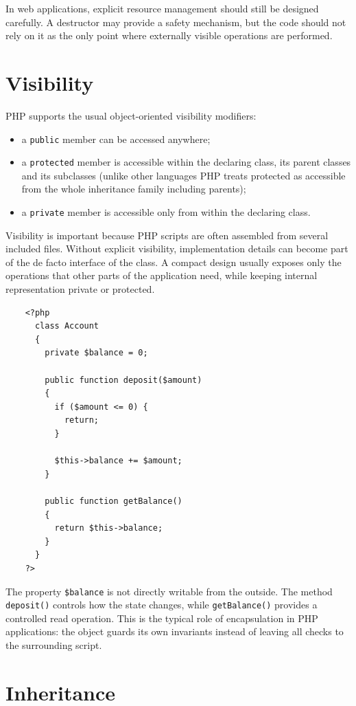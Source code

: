 \documentclass{scrbook}
\begin{document}
	In web applications, explicit resource management should still be designed carefully. A destructor may provide a safety mechanism, but the code should not rely on it as the only point where externally visible operations are performed.
	
	\newpage
	\section{Visibility}
	
	PHP supports the usual object-oriented visibility modifiers:
	\begin{itemize}
		\item a \texttt{public} member can be accessed anywhere;
		\item a \texttt{protected} member is accessible within the declaring class, its parent classes and its subclasses (unlike other languages PHP treats protected as accessible from the whole inheritance family including parents);
		\item a \texttt{private} member is accessible only from within the declaring class.
	\end{itemize}
	
	Visibility is important because PHP scripts are often assembled from several included files. Without explicit visibility, implementation details can become part of the de facto interface of the class. A compact design usually exposes only the operations that other parts of the application need, while keeping internal representation private or protected.
	
	\begin{lstlisting}
	<?php
	  class Account
	  {
		private $balance = 0;
	
		public function deposit($amount)
		{
		  if ($amount <= 0) {
			return;
		  }
		
		  $this->balance += $amount;
		}
	
		public function getBalance()
		{
		  return $this->balance;
		}
	  }
	?>
	\end{lstlisting}
	
	The property \texttt{\$balance} is not directly writable from the outside. The method \texttt{deposit()} controls how the state changes, while \texttt{getBalance()} provides a controlled read operation. This is the typical role of encapsulation in PHP applications: the object guards its own invariants instead of leaving all checks to the surrounding script.
	
	\newpage
	\section{Inheritance}
	
\end{document}
